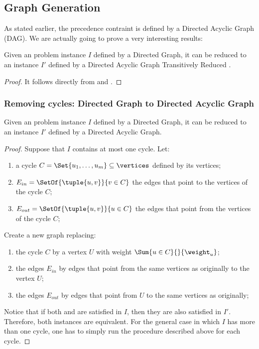 \subsection{Graph Generation}

As stated earlier, the precedence contraint is defined by a Directed Acyclic Graph (DAG). We are actually going to prove a very interesting results:

\begin{theorem}
    Given an problem instance $I$ defined by a Directed Graph, it can be reduced to an instance $I'$ defined by a Directed Acyclic Graph Transitively Reduced \cite{bib:transitive-reduction}.
\end{theorem}

\begin{proof}
    It follows directly from  and .
\end{proof}

\subsubsection{Removing cycles: Directed Graph to Directed Acyclic Graph}

\begin{lemma}
    \label{lemma:reduction-1}
    Given an problem instance $I$ defined by a Directed Graph, it can be reduced to an instance $I'$ defined by a Directed Acyclic Graph.
\end{lemma}

\begin{proof}
    Suppose that $I$ contains at most one cycle. Let:
    \begin{enumerate}
        \item a cycle $C = \Set{u_1, \dots, u_m} \subseteq \vertices$ defined by its vertices;
        \item $E_{in} = \SetOf{\tuple{u, v}}{v \in C}$ the edges that point to the vertices of the cycle $C$;
        \item $E_{out} = \SetOf{\tuple{u, v}}{u \in C}$ the edges that point from the vertices of the cycle $C$;
    \end{enumerate}
    Create a new graph replacing:
    \begin{enumerate}
        \item the cycle $C$ by a vertex $U$ with weight $\Sum{u \in C}{}{\weight_u}$;
        \item the edges $E_{in}$ by edges that point from the same vertices as originally to the vertex $U$;
        \item the edges $E_{out}$ by edges that point from $U$ to the same vertices as originally;
    \end{enumerate}
    Notice that if both \precedenceConstraint and \capacityConstraint are satisfied in $I$, then they are also satisfied in $I'$. Therefore, both instances are equivalent.
    For the general case in which $I$ has more than one cycle, one has to simply run the procedure described above for each cycle.
\end{proof}

